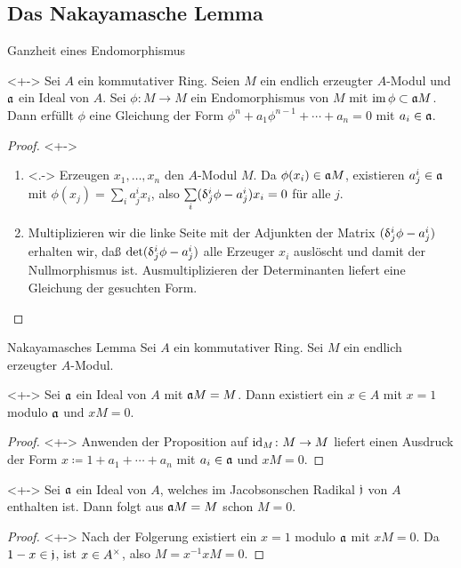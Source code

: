 \subsection{Das Nakayamasche Lemma}

\begin{frame}{Ganzheit eines Endomorphismus}
	\begin{proposition}<+->
		Sei \(A\) ein kommutativer Ring.
		Seien \(M\) ein endlich erzeugter \(A\)-Modul und \(\mathfrak{a}\) ein Ideal von \(A\).
		Sei \(\phi\colon M \to M\) ein Endomorphismus von \(M\) mit \(\operatorname{im} \phi \subset \mathfrak{a} M\).
		\\
		Dann erfüllt \(\phi\) eine Gleichung der Form
		\(\phi^n + a_1 \phi^{n - 1} + \dotsb + a_n = 0\) mit \(a_i \in \mathfrak{a}\).
	\end{proposition}
	\begin{proof}<+->
	\begin{enumerate}[<+->]
	\item<.->
		Erzeugen \(x_1, \dotsc, x_n\) den \(A\)-Modul \(M\). Da \(\phi(x_i) \in \mathfrak{a} M\),
		existieren \(a^i_j \in \mathfrak{a}\) mit \(\phi(x_j) = \sum\limits_i a^i_j x_i\), also
		\(\sum\limits_i (\updelta^i_j \phi - a^i_j) x_i = 0\) für alle \(j\).
	\item
		Multiplizieren wir die linke Seite mit der Adjunkten der Matrix \((\updelta^i_j \phi - a^i_j)\)
		erhalten wir, daß \(\det (\updelta^i_j \phi - a^i_j)\) alle Erzeuger \(x_i\) auslöscht und damit
		der Nullmorphismus ist. Ausmultiplizieren der Determinanten liefert eine Gleichung der
		gesuchten Form.
		\qedhere
	\end{enumerate}
	\end{proof}
\end{frame}

\begin{frame}{Nakayamasches Lemma}
	Sei \(A\) ein kommutativer Ring. Sei \(M\) ein endlich erzeugter \(A\)-Modul.
	\begin{corollary}<+->
		Sei \(\mathfrak{a}\) ein Ideal von \(A\) mit \(\mathfrak{a} M = M\). Dann existiert ein \(x \in A\) mit
		\(x = 1\) modulo \(\mathfrak{a}\) und \(x M = 0\).
	\end{corollary}
	\begin{proof}<+->
		Anwenden der Proposition auf \(\operatorname{id}_M\colon M \to M\) liefert einen Ausdruck der Form
		\(x \coloneqq 1 + a_1 + \dotsb + a_n\) mit \(a_i \in \mathfrak{a}\) und \(x M = 0\).
	\end{proof}
	\begin{proposition}<+->
		Sei \(\mathfrak{a}\) ein Ideal von \(A\), welches im Jacobsonschen Radikal \(\mathfrak{j}\) von \(A\)
		enthalten ist.
		Dann folgt aus \(\mathfrak{a} M = M\) schon \(M = 0\).
	\end{proposition}
	\begin{proof}<+->
		Nach der Folgerung existiert ein \(x = 1\) modulo \(\mathfrak{a}\)
		mit \(x M = 0\). Da \(1 - x \in \mathfrak{j}\),
		ist \(x \in A^\times\), also \(M = x^{-1} x M = 0\).
	\end{proof}
\end{frame}

